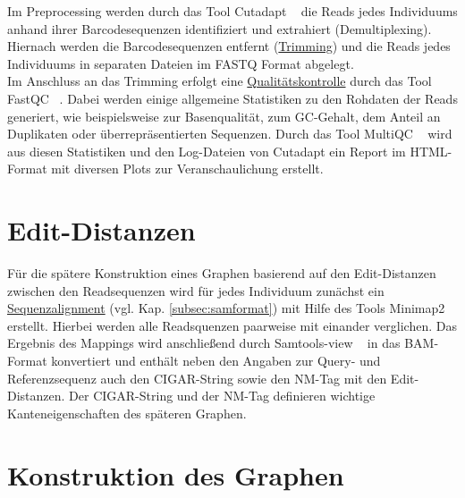 Im Preprocessing werden durch das Tool Cutadapt ~\cite{martin_2011} die Reads jedes Individuums anhand ihrer Barcodesequenzen identifiziert und extrahiert (Demultiplexing). Hiernach werden die Barcodesequenzen entfernt (\hyperref[step15]{Trimming\label{schritt1txt}}) und die Reads jedes Individuums in separaten Dateien im FASTQ Format abgelegt. \\

Im Anschluss an das Trimming erfolgt eine \hyperref[schritt2]{Qualitätskontrolle\label{schritt2txt}} durch das Tool FastQC  ~\cite{andrews_2012}. Dabei werden einige allgemeine Statistiken zu den Rohdaten der Reads generiert, wie beispielsweise zur Basenqualität, zum GC-Gehalt, dem Anteil an Duplikaten oder überrepräsentierten Sequenzen. Durch das Tool MultiQC ~\cite{ewels_2016} wird aus diesen Statistiken und den Log-Dateien von Cutadapt ein Report im HTML-Format mit diversen Plots zur Veranschaulichung erstellt.

\section{Edit-Distanzen} \label{sec:edit}

Für die spätere Konstruktion eines Graphen basierend auf den Edit-Distanzen zwischen den Readsequenzen wird für jedes Individuum zunächst ein \hyperref[schritt3]{Sequenzalignment\label{schritt3txt}} (vgl. Kap. \ref {subsec:samformat}) mit Hilfe des Tools Minimap2 ~\cite{li_2018} erstellt. Hierbei werden alle Readsquenzen paarweise mit einander verglichen. Das Ergebnis des Mappings wird anschließend durch Samtools-view ~\cite{li_2009} in das BAM-Format konvertiert und enthält neben den Angaben zur Query- und Referenzsequenz auch den CIGAR-String sowie den NM-Tag mit den Edit-Distanzen. Der CIGAR-String und der NM-Tag definieren wichtige Kanteneigenschaften des späteren Graphen. \\

\section{Konstruktion des Graphen} \label{sec:graph}

